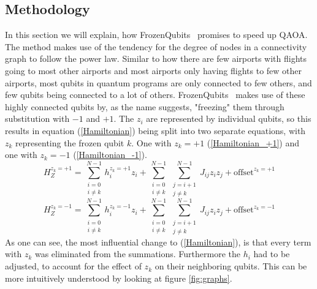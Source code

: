\subsection{Methodology}\label{methodology}
In this section we will explain, how FrozenQubits~\cite{frozenqubits} promises to speed up QAOA. The method makes use of the tendency for the degree of nodes in a connectivity graph to follow the power law. Similar to how there are few airports with flights going to most other airports and most airports only having flights to few other airports, most qubits in quantum programs are only connected to few others, and few qubits being connected to a lot of others. FrozenQubits~\cite{frozenqubits} makes use of these highly connected qubits by, as the name suggests, "freezing" them through substitution with $-1$ and $+1$. The $z_i$ are represented by individual qubits, so this results in equation (\ref{Hamiltonian}) being split into two separate equations, with $z_k$ representing the frozen qubit $k$. One with $z_k=+1$ (\ref{Hamiltonian_+1}) and one with $z_k=-1$ (\ref{Hamiltonian_-1}).
\begin{equation}\label{Hamiltonian_+1}
    H_Z^{z_k=+1}=\sum_{\substack{i=0 \\ i \neq k}}^{N-1} h_i^{z_k=+1}z_i+\sum^{N-1}_{\substack{i=0 \\ i \neq k}}\sum^{N-1}_{\substack{j=i+1 \\ j \neq k}}J_{ij}z_iz_j+\text{offset}^{z_k=+1}
\end{equation}
\begin{equation}\label{Hamiltonian_-1}
    H_Z^{z_k=-1}=\sum_{\substack{i=0 \\ i \neq k}}^{N-1} h_i^{z_k=-1}z_i+\sum^{N-1}_{\substack{i=0 \\ i \neq k}}\sum^{N-1}_{\substack{j=i+1 \\ j \neq k}}J_{ij}z_iz_j+\text{offset}^{z_k=-1}
\end{equation}
As one can see, the most influential change to (\ref{Hamiltonian}), is that every term with $z_k$ was eliminated from the summations. Furthermore the $h_i$ had to be adjusted, to account for the effect of $z_k$ on their neighboring qubits. This can be more intuitively understood by looking at figure \ref{fig:graphs}.
